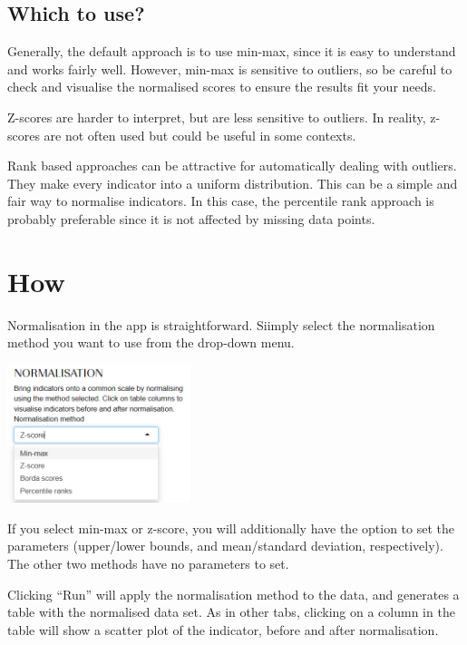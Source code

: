 \documentclass[
  letterpaper,
  DIV=11,
  numbers=noendperiod]{scrreprt}
\begin{document}
\hypertarget{which-to-use}{%
\subsection{Which to use?}\label{which-to-use}}

Generally, the default approach is to use min-max, since it is easy to
understand and works fairly well. However, min-max is sensitive to
outliers, so be careful to check and visualise the normalised scores to
ensure the results fit your needs.

Z-scores are harder to interpret, but are less sensitive to outliers. In
reality, z-scores are not often used but could be useful in some
contexts.

Rank based approaches can be attractive for automatically dealing with
outliers. They make every indicator into a uniform distribution. This
can be a simple and fair way to normalise indicators. In this case, the
percentile rank approach is probably preferable since it is not affected
by missing data points.

\hypertarget{how-3}{%
\section{How}\label{how-3}}

Normalisation in the app is straightforward. Siimply select the
normalisation method you want to use from the drop-down menu.

\includegraphics[width=0.4\textwidth,height=\textheight]{figs/normalisation_1.png}

If you select min-max or z-score, you will additionally have the option
to set the parameters (upper/lower bounds, and mean/standard deviation,
respectively). The other two methods have no parameters to set.

Clicking ``Run'' will apply the normalisation method to the data, and
generates a table with the normalised data set. As in other tabs,
clicking on a column in the table will show a scatter plot of the
indicator, before and after normalisation.
\end{document}

